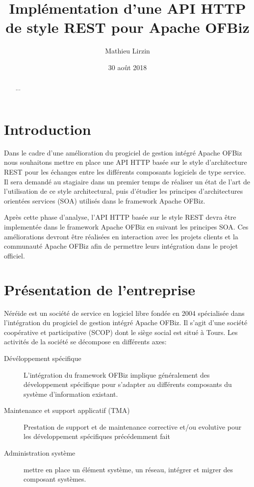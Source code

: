 \documentclass[a4paper, 11pt]{report}
\title{Implémentation d'une API HTTP de style REST pour Apache OFBiz}
\author{Mathieu Lirzin}
\date{30 août 2018}
\begin{document}
\maketitle

\begin{abstract}
  ...
\end{abstract}

\tableofcontents
\clearpage
\chapter*{Introduction}

Dans le cadre d'une amélioration du progiciel de gestion intégré
Apache OFBiz nous souhaitons mettre en place une API HTTP basée sur le
style d'architecture REST pour les échanges entre les différents
composants logiciels de type service. Il sera demandé au stagiaire
dans un premier temps de réaliser un état de l'art de l'utilisation de
ce style architectural, puis d'étudier les principes d'architectures
orientées services (SOA) utilisés dans le framework Apache OFBiz.

Après cette phase d'analyse, l'API HTTP basée sur le style REST devra
être implementée dans le framework Apache OFBiz en suivant les
principes SOA.  Ces améliorations devront être réalisées en
interaction avec les projets clients et la communauté Apache OFBiz
afin de permettre leurs intégration dans le projet officiel.

\chapter{Présentation de l'entreprise}

Néréide est un société de service en logiciel libre fondée en 2004
spécialisée dans l'intégration du progiciel de gestion intégré Apache
OFBiz.  Il s'agit d'une société coopérative et participative (SCOP)
dont le siège social est situé à Tours.  Les activités de la société
se décompose en différents axes:

\begin{description}
\item[Dévéloppement spécifique] L'intégration du framework OFBiz
  implique généralement des développement spécifique pour s'adapter au
  différents composants du système d'information existant.
\item[Maintenance et support applicatif (TMA)] Prestation de support
  et de maintenance corrective et/ou evolutive pour les développement
  spécifiques précédemment fait
\item[Administration système] mettre en place un élément système, un
  réseau, intégrer et migrer des composant systèmes.
\end{description}
\end{document}

